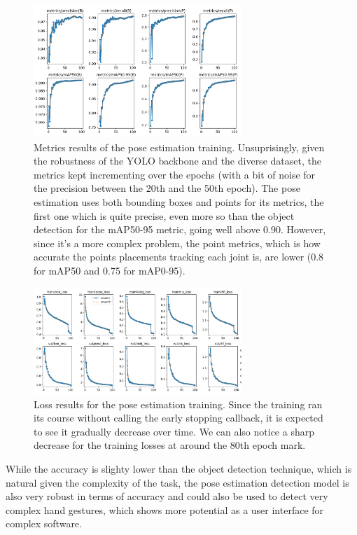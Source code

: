 \documentclass[12pt]{article}
\begin{document}
\begin{figure}[H]
  \centering
  \includegraphics[width=0.7\textwidth]{./pictures/pose_results_metrics.png}
  \caption{Metrics results of the pose estimation training. Unsuprisingly, given the robustness of the YOLO backbone and the diverse dataset, the metrics kept incrementing over the epochs (with a bit of noise for the precision between the 20th and the 50th epoch). The pose estimation uses both bounding boxes and points for its metrics, the first one which is quite precise, even more so than the object detection for the mAP50-95 metric, going well above 0.90. However, since it's a more complex problem, the point metrics, which is how accurate the points placements tracking each joint is, are lower (0.8 for mAP50 and 0.75 for mAP0-95).}
\end{figure}

\begin{figure}
  \centering
  \includegraphics[width=0.7\textwidth]{./pictures/pose_results_losses.png}
  \caption{Loss results for the pose estimation training. Since the training ran its course without calling the early stopping callback, it is expected to see it gradually decrease over time. We can also notice a sharp decrease for the training losses at around the 80th epoch mark.}
\end{figure}

While the accuracy is slighty lower than the object detection technique, which is natural given the complexity of the task, the pose estimation detection model is also very robust in terms of accuracy and could also be used to detect very complex hand gestures, which shows more potential as a user interface for complex software.
\end{document}
